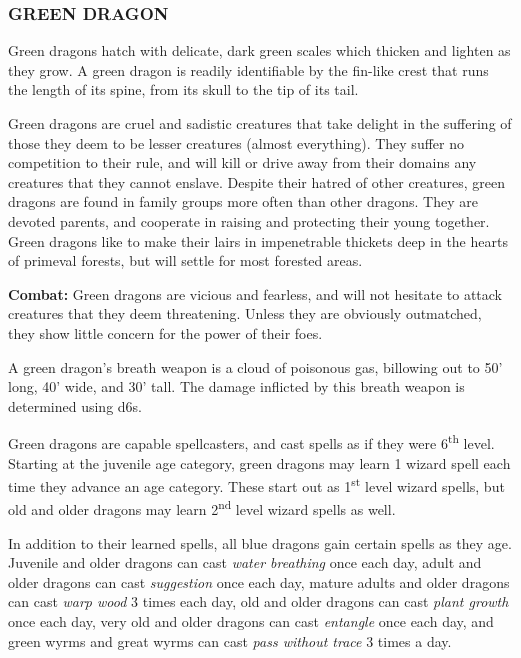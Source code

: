 \begin{multicols}{2}
\subsubsection{GREEN DRAGON}

Green dragons hatch with delicate, dark green scales which thicken and lighten as they grow. A green dragon is readily identifiable by the fin-like crest that runs the length of its spine, from its skull to the tip of its tail.

Green dragons are cruel and sadistic creatures that take delight in the suffering of those they deem to be lesser creatures (almost everything). They suffer no competition to their rule, and will kill or drive away from their domains any creatures that they cannot enslave. Despite their hatred of other creatures, green dragons are found in family groups more often than other dragons. They are devoted parents, and cooperate in raising and protecting their young together.  Green dragons like to make their lairs in impenetrable thickets deep in the hearts of primeval forests, but will settle for most forested areas.

\textbf{Combat:} Green dragons are vicious and fearless, and will not hesitate to attack creatures that they deem threatening. Unless they are obviously outmatched, they show little concern for the power of their foes.

A green dragon's breath weapon is a cloud of poisonous gas, billowing out to 50' long, 40' wide, and 30' tall. The damage inflicted by this breath weapon is determined using d6s. 

Green dragons are capable spellcasters, and cast spells as if they were 6\textsuperscript{th} level. Starting at the juvenile age category, green dragons may learn 1 wizard spell each time they advance an age category. These start out as 1\textsuperscript{st} level wizard spells, but old and older dragons may learn 2\textsuperscript{nd} level wizard spells as well.

In addition to their learned spells, all blue dragons gain certain spells as they age. Juvenile and older dragons can cast \textit{water breathing} once each day, adult and older dragons can cast \textit{suggestion} once each day, mature adults and older dragons can cast \textit{warp wood} 3 times each day, old and older dragons can cast \textit{plant growth} once each day, very old and older dragons can cast \textit{entangle} once each day, and green wyrms and great wyrms can cast \textit{pass without trace} 3 times a day.


\end{multicols}
